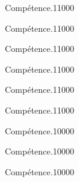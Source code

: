 \begin{pageParcourst} %

\begin{ExoCtN}{Compétence.}{1}{1}{0}{0}{0}
 
\end{ExoCtN}

\begin{ExoCtN}{Compétence.}{1}{1}{0}{0}{0}
 
\end{ExoCtN}

\begin{ExoCtN}{Compétence.}{1}{1}{0}{0}{0}
 
\end{ExoCtN}

\begin{ExoCtN}{Compétence.}{1}{1}{0}{0}{0}
 
\end{ExoCtN}

\begin{ExoCtN}{Compétence.}{1}{1}{0}{0}{0}
 
\end{ExoCtN}

\begin{ExoCtN}{Compétence.}{1}{1}{0}{0}{0}
 
\end{ExoCtN}
 
\end{pageParcourst} %


\begin{pageAuto} %

\begin{ExoAutoN}{Compétence.}{1}{0}{0}{0}{0}

\end{ExoAutoN}

\begin{ExoAutoN}{Compétence.}{1}{0}{0}{0}{0}

\end{ExoAutoN}


\begin{ExoAutoN}{Compétence.}{1}{0}{0}{0}{0}

\end{ExoAutoN}

\end{pageAuto} %

